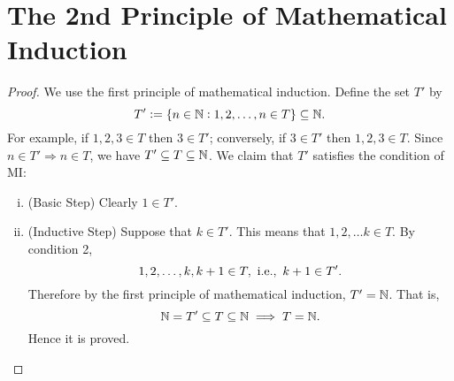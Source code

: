 \documentclass[11pt,openany]{article}
\begin{document}
\section{The 2nd Principle of Mathematical Induction}
\begin{proof}
	We use the first principle of mathematical induction. Define the set $T'$ by \[
	T':=\set{n\in\mathbb{N}:1,2,\dots,n\in T}\subseteq\mathbb{N}.
	\] For example, if $1,2,3\in T$ then $3\in T'$; conversely, if $3\in T'$ then $1,2,3\in T$. Since $n\in T'\Rightarrow n\in T$, we have $T'\subseteq T\subseteq\mathbb{N}$. We claim that $T'$ satisfies the condition of MI: \begin{enumerate}[(i)]
		\item (Basic Step) Clearly $1\in T'$.
		\item (Inductive Step) Suppose that $k\in T'$. This means that $1,2,\dots k\in T$. By condition 2, \[
		1,2,\dots,k,k+1\in T,\ \ie,\ k+1\in T'.
		\] Therefore by the first principle of mathematical induction, $T'=\mathbb{N}$. That is, \[
		\mathbb{N}=T'\subseteq T\subseteq\mathbb{N}\implies T=\mathbb{N}.
		\] Hence it is proved.
	\end{enumerate}
\end{proof}
\end{document}
